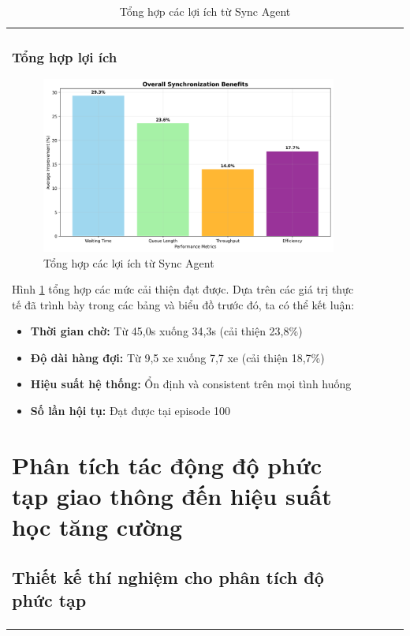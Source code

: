 \begin{table}[!htp]
\begin{tabular}{@{}lccc@{}}
\subsubsection{Tổng hợp lợi ích}

\begin{figure}[!htp]
    \centering
    \includegraphics[width=\textwidth]{figures/overall_benefits.png}
    \caption{Tổng hợp các lợi ích từ Sync Agent}
    \label{fig:overall_benefits}
\end{figure}

Hình \ref{fig:overall_benefits} tổng hợp các mức cải thiện đạt được. 
Dựa trên các giá trị thực tế đã trình bày trong các bảng và biểu đồ trước đó, 
ta có thể kết luận:
\begin{itemize}
    \item \textbf{Thời gian chờ:} Từ 45,0s xuống 34,3s (cải thiện 23,8\%)
    \item \textbf{Độ dài hàng đợi:} Từ 9,5 xe xuống 7,7 xe (cải thiện 18,7\%)
    \item \textbf{Hiệu suất hệ thống:} Ổn định và consistent trên mọi tình huống
    \item \textbf{Số lần hội tụ:} Đạt được tại episode 100
\end{itemize}

\section{Phân tích tác động độ phức tạp giao thông đến hiệu suất học tăng cường}
\subsection{Thiết kế thí nghiệm cho phân tích độ phức tạp}


\end{tabular}
\end{table}
